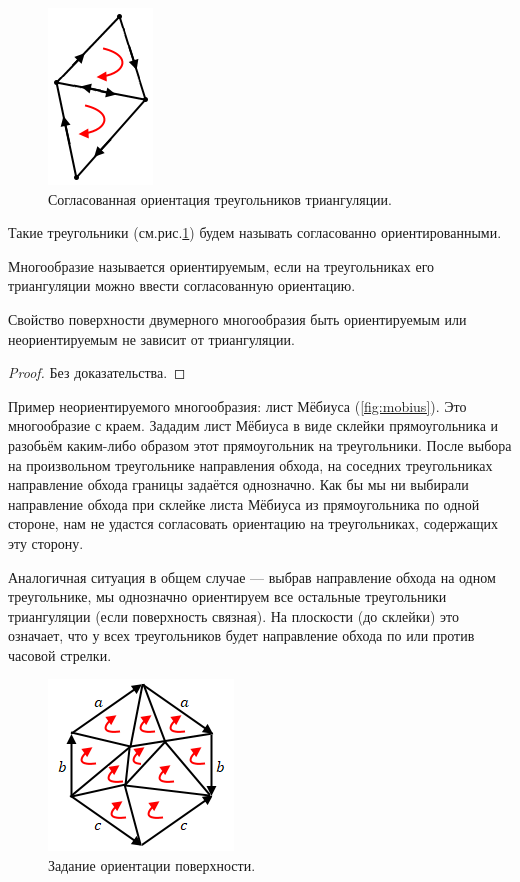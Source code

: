 \begin{figure}[htbp]
    \centering
    \includegraphics[scale=0.7]{images/c11.2.png}
    \caption{Согласованная ориентация треугольников триангуляции.}
    \label{fig:c11.2}
\end{figure}

Такие треугольники (см.рис.\ref{fig:c11.2}) будем называть согласованно ориентированными.

\begin{definition}
    Многообразие называется ориентируемым, если на треугольниках его триангуляции можно ввести согласованную ориентацию.
\end{definition} 

\begin{statement}
    Свойство поверхности двумерного многообразия быть ориентируемым или неориентируемым не зависит от триангуляции.
\end{statement} 
\begin{proof}
    Без доказательства.
\end{proof} 

Пример неориентируемого многообразия: лист Мёбиуса (\ref{fig:mobius}). Это многообразие с краем. Зададим лист Мёбиуса в виде склейки прямоугольника и разобьём каким-либо образом этот прямоугольник на треугольники. После выбора на произвольном треугольнике направления обхода, на соседних треугольниках направление обхода границы задаётся однозначно. Как бы мы ни выбирали направление обхода при склейке листа Мёбиуса из прямоугольника по одной стороне, нам не удастся согласовать ориентацию на треугольниках, содержащих эту сторону.

Аналогичная ситуация в общем случае — выбрав направление обхода на одном треугольнике, мы однозначно ориентируем все остальные треугольники триангуляции (если поверхность связная). На плоскости (до склейки) это означает, что у всех треугольников будет направление обхода по или против часовой стрелки.

\begin{figure}[htbp]
    \centering
    \includegraphics[scale=0.7]{images/c11.3.png}
    \caption{Задание ориентации поверхности.}
    \label{fig:c11.3}
\end{figure}

